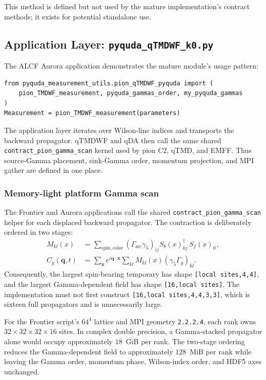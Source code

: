 \documentclass[11pt]{article}
\begin{document}
This method is defined but not used by the mature implementation's contract methods; it exists for potential standalone use.

\subsection{Application Layer: \texttt{pyquda\_qTMDWF\_k0.py}}

The ALCF Aurora application demonstrates the mature module's usage pattern:

\begin{lstlisting}
from pyquda_measurement_utils.pion_qTMDWF_pyquda import (
    pion_TMDWF_measurement, pyquda_gammas_order, my_pyquda_gammas
)
Measurement = pion_TMDWF_measurement(parameters)
\end{lstlisting}

The application layer iterates over Wilson-line indices and transports the
backward propagator. qTMDWF and qDA then call the same shared
\texttt{contract\_pion\_gamma\_scan} kernel used by pion C2, qTMD, and EMFF.
Thus source-Gamma placement, sink-Gamma order, momentum projection, and MPI
gather are defined in one place.

\subsubsection{Memory-light platform Gamma scan}

The Frontier and Aurora applications call the shared
\texttt{contract\_pion\_gamma\_scan} helper for each displaced backward
propagator.  The contraction is deliberately ordered in two stages:
\begin{align}
 M_{kl}(x)
 &=
 \sum_{\mathrm{spin,color}}
 (\Gamma_{\mathrm{src}}\gamma_5)_{ij}
 S_b(x)^\dagger_{kj}\,S_f(x)_{li},
 \\
 C_g(\mathbf q,t)
 &=
 \sum_{\mathbf x}e^{i\mathbf q\cdot\mathbf x}
 \sum_{kl}M_{kl}(x)(\gamma_5\Gamma_g)_{kl}.
\end{align}
Consequently, the largest spin-bearing temporary has shape
\texttt{[local sites,4,4]}, and the largest Gamma-dependent field has shape
\texttt{[16,local sites]}.  The implementation must not first construct
\texttt{[16,local sites,4,4,3,3]}, which is sixteen full propagators and is
unnecessarily large.

For the Frontier script's $64^4$ lattice and MPI geometry
\texttt{2.2.2.4}, each rank owns $32\times32\times32\times16$ sites.  In
complex double precision, a Gamma-stacked propagator alone would occupy
approximately $18$~GiB per rank.  The two-stage ordering reduces the
Gamma-dependent field to approximately $128$~MiB per rank while leaving the
Gamma order, momentum phase, Wilson-index order, and HDF5 axes unchanged.
\end{document}
